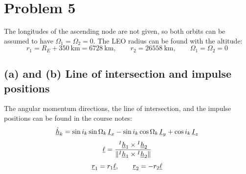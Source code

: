\section{Problem 5}
\label{sec:problem5}

The longitudes of the ascending node are not given, so both orbits can be assumed to have $\Omega_1=\Omega_2=0$. The LEO radius can be found with the altitude:
\begin{equation*}
r_1 = R_E + 350~\text{km} = 6728~\text{km}, \qquad r_2 = 26558~\text{km}, \qquad \Omega_1 = \Omega_2 = 0
\end{equation*}

\subsection*{(a) and (b) Line of intersection and impulse positions}
The angular momentum directions, the line of intersection, and the impulse positions can be found in the course notes:
\begin{equation*}
\hat{\underline{h}}_k = \sin i_k\sin\Omega_k\,\underline{I}_x - \sin i_k\cos\Omega_k\,\underline{I}_y + \cos i_k\,\underline{I}_z
\end{equation*}
\begin{equation*}
\underline{\ell} = \frac{{}^{I}\underline{h}_1\times{}^{I}\underline{h}_2}{\|{}^{I}\underline{h}_1\times{}^{I}\underline{h}_2\|}
\end{equation*}
\begin{equation*}
\underline{r}_1 = r_1\underline{\ell}, \qquad \underline{r}_2 = -r_2\underline{\ell}
\end{equation*}

